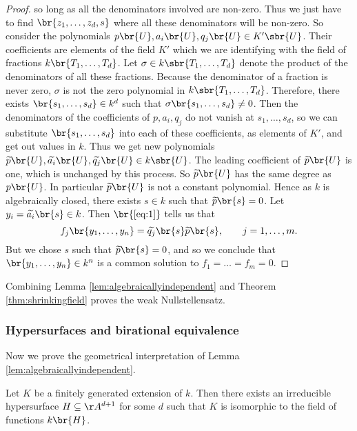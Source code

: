 \begin{proof}
\pagebreak

so long as all the denominators involved are non-zero. Thus we just have to find $ \br{z_1, \dots, z_d, s} $ where all these denominators will be non-zero. So consider the polynomials $ p\br{U}, a_i\br{U}, q_j\br{U} \in K'\sbr{U} $.
Their coefficients are elements of the field $ K' $ which we are identifying with the field of fractions $ k\br{T_1, \dots, T_d} $. Let $ \sigma \in k\sbr{T_1, \dots, T_d} $ denote the product of the denominators of all these fractions. Because the denominator of a fraction is never zero, $ \sigma $ is not the zero polynomial in $ k\sbr{T_1, \dots, T_d} $. Therefore, there exists $ \br{s_1, \dots, s_d} \in k^d $ such that $ \sigma\br{s_1, \dots, s_d} \ne 0 $. Then the denominators of the coefficients of $ p, a_i, q_j $ do not vanish at $ s_1, \dots, s_d $, so we can substitute $ \br{s_1, \dots, s_d} $ into each of these coefficients, as elements of $ K' $, and get out values in $ k $. Thus we get new polynomials $ \widetilde{p}\br{U}, \widetilde{a_i}\br{U}, \widetilde{q_j}\br{U} \in k\sbr{U} $. The leading coefficient of $ \widetilde{p}\br{U} $ is one, which is unchanged by this process. So $ \widetilde{p}\br{U} $ has the same degree as $ p\br{U} $. In particular $ \widetilde{p}\br{U} $ is not a constant polynomial. Hence as $ k $ is algebraically closed, there exists $ s \in k $ such that $ \widetilde{p}\br{s} = 0 $. Let $ y_i = \widetilde{a_i}\br{s} \in k $. Then $ \br{\ref{eq:1}} $ tells us that
$$ f_j\br{y_1, \dots, y_n} = \widetilde{q_j}\br{s}\widetilde{p}\br{s}, \qquad j = 1, \dots, m. $$
But we chose $ s $ such that $ \widetilde{p}\br{s} = 0 $, and so we conclude that $ \br{y_1, \dots, y_n} \in k^n $ is a common solution to $ f_1 = \dots = f_m = 0 $.
\end{proof}

Combining Lemma \ref{lem:algebraicallyindependent} and Theorem \ref{thm:shrinkingfield} proves the weak Nullstellensatz.

\subsubsection{Hypersurfaces and birational equivalence}

Now we prove the geometrical interpretation of Lemma \ref{lem:algebraicallyindependent}.

\begin{proposition}
\label{prop:irreduciblehypersurface}
Let $ K $ be a finitely generated extension of $ k $. Then there exists an irreducible hypersurface $ H \subseteq \AA^{d + 1} $ for some $ d $ such that $ K $ is isomorphic to the field of functions $ k\br{H} $.
\end{proposition}

